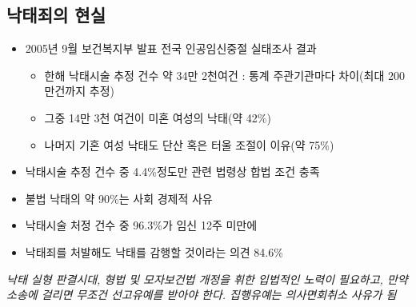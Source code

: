 \subsection{낙태죄의 현실}
\begin{itemize}\tightlist
\item 2005년 9월 보건복지부 발표 전국 인공임신중절 실태조사 결과
	\begin{itemize}\tightlist
	\item 한해 낙태시술 추정 건수 약 34만 2천여건 : 통계 주관기관마다 차이(최대 200만건까지 추정)
	\item 그중 14만 3천 여건이 미혼 여성의 낙태(약 42\%)
	\item 나머지 기혼 여성 낙태도 단산 혹은 터울 조절이 이유(약 75\%)
	\end{itemize}
\item 낙태시술 추정 건수 중 4.4\%정도만 관련 법령상 합법 조건 충족
\item 불법 낙태의 약 90\%는 사회 경제적 사유
\item 낙태시술 처정 건수 중 96.3\%가 임신 12주 미만에
\item 낙태죄를 처발해도 낙태를 감행할 것이라는 의견 84.6\%	
\end{itemize}
\Large \emph{낙태 실형 판결시대, 형법 및 모자보건법 개정을 휘한 입법적인 노력이 필요하고, 만약 소송에 걸리면 무조건 선고유예를 받아야 한다. 집행유예는 의사면회취소 사유가 됨}
\normalsize
